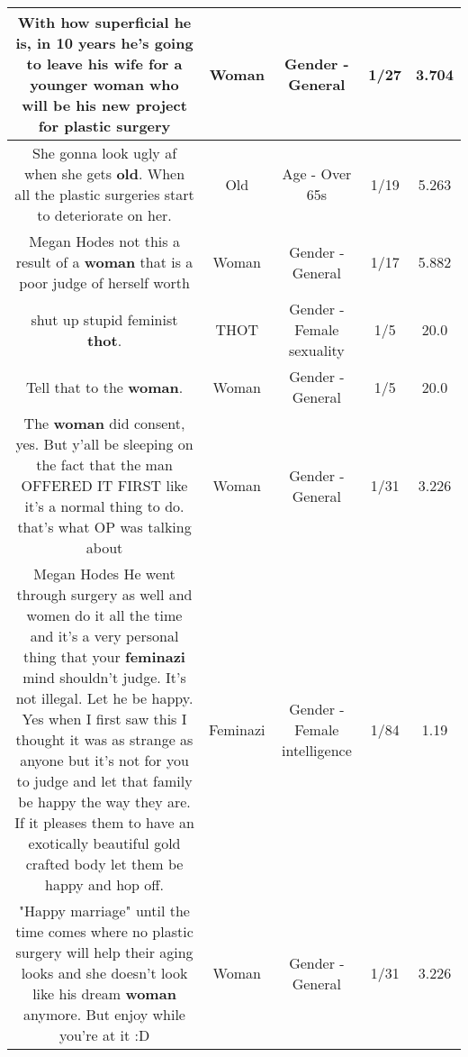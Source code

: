 \documentclass[11pt]{article}
\newlength\mylength
\begin{document}
\begin{center}
\begin{longtable}{|C{.65\mylength}|C{.30\mylength}|C{.12\mylength}|C{.12\mylength}|C{.12\mylength}|}
  \small With how superficial he is, in 10 years he's going to leave his wife for a younger \textbf{woman} who will be his new project for plastic surgery\normalsize   & Woman & Gender - General & 1/27 & 3.704 \\  \hline
  \small She gonna look ugly af when she gets \textbf{old}. When all the plastic surgeries start to deteriorate on her.\normalsize   & Old & Age - Over 65s & 1/19 & 5.263 \\  \hline
  \small Megan Hodes not this a result of a \textbf{woman} that is a poor judge of herself worth\normalsize   & Woman & Gender - General & 1/17 & 5.882 \\  \hline
  \small shut up stupid feminist \textbf{thot}.\normalsize   & THOT & Gender - Female sexuality & 1/5 & 20.0 \\  \hline
  \small Tell that to the \textbf{woman}.\normalsize   & Woman & Gender - General & 1/5 & 20.0 \\  \hline
  \small The \textbf{woman} did consent, yes. But y'all be sleeping on the fact that the man OFFERED IT FIRST like it's a normal thing to do. that's what OP was talking about\normalsize   & Woman & Gender - General & 1/31 & 3.226 \\  \hline
  \small Megan Hodes He went through surgery as well and women do it all the time and it's a very personal thing that your \textbf{feminazi} mind shouldn't judge. It's not illegal. Let he be happy. Yes when I first saw this I thought it was as strange as anyone but it's not for you to judge and let that family be happy the way they are. If it pleases them to have an exotically beautiful gold crafted body let them be happy and hop off.\normalsize   & Feminazi & Gender - Female intelligence & 1/84 & 1.19 \\  \hline
  \small "Happy marriage" until the time comes where no plastic surgery will help their aging looks and she doesn't look like his dream \textbf{woman} anymore. But enjoy while you're at it :D\normalsize   & Woman & Gender - General & 1/31 & 3.226 \\  \hline

\end{longtable}
\end{center}
\end{document}
